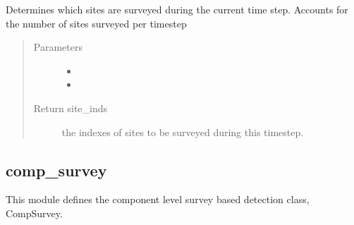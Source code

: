 \documentclass[letterpaper,10pt,english]{sphinxmanual}
\begin{document}
\begin{fulllineitems}
\begin{fulllineitems}
\begin{quote}
\begin{description}
\end{description}\end{quote}

\end{fulllineitems}


\begin{fulllineitems}
\label{\detokenize{index:feast.DetectionModules.site_survey.SiteSurvey.sites_surveyed}}
Determines which sites are surveyed during the current time step.
Accounts for the number of sites surveyed per timestep
\begin{quote}\begin{description}
\item[{Parameters}] \leavevmode\begin{itemize}
\item {} 
 \textendash{} 

\item {} 
 \textendash{} 

\end{itemize}

\item[{Return site\_inds}] \leavevmode
the indexes of sites to be surveyed during this timestep.

\end{description}\end{quote}

\end{fulllineitems}


\end{fulllineitems}



\subsection{comp\_survey}
\label{\detokenize{index:module-feast.DetectionModules.comp_survey}}\label{\detokenize{index:comp-survey}}
This module defines the component level survey based detection class, CompSurvey.
\end{document}
